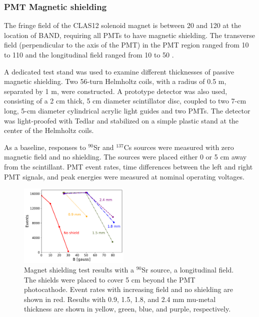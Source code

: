 \documentclass[3p,twocolumn]{elsarticle}
\begin{document}
\subsubsection{PMT Magnetic shielding}


The fringe field of the CLAS12 solenoid magnet
\cite{Fair:2020yfx} is between 20 and 120 \si{\gauss} at the location of
BAND, requiring all PMTs to have magnetic shielding. The transverse
field (perpendicular to the axis of the PMT) in the PMT region ranged from 10 to
  110 \si{\gauss} and the longitudinal field ranged from 10 to 50 \si{\gauss}.

  A dedicated test stand was used to examine different thicknesses of
  passive magnetic shielding. Two 56-turn Helmholtz
  coils, with a radius of 0.5 \si{\meter}, separated by 1 \si{\meter}, were 
  constructed. A prototype detector was also used, consisting of a 2 \si{\centi\meter} thick, 5
  \si{\centi\meter} diameter scintillator disc, coupled to two
  7-\si{\centi\meter} long, 5-\si{\centi\meter} diameter cylindrical
  acrylic light guides and two PMTs. The detector was
  light-proofed with Tedlar\textregistered{} and stabilized on a simple plastic stand
  at the center of the Helmholtz coils.

  As a baseline, responses to $^{90}$Sr and $^{137}$Cs sources were measured with zero magnetic field and no shielding. The sources were placed either 0 or 5 \si{\centi\meter} away from the scintillant. PMT event rates, time differences between the left and right PMT signals, and peak energies were measured at nominal operating voltages.
\begin{figure}[tb]
	\centering
			\includegraphics[width=0.47\textwidth]{fig9-shields.pdf}
	\caption{Magnet shielding test results with a $^{90}$Sr source, a longitudinal field. The shields were placed to cover 5 \si{\centi\meter} beyond the PMT photocathode. Event rates with increasing field and no shielding are shown in red. Results with 0.9, 1.5, 1.8, and 2.4 \si{\milli\meter} mu-metal thickness are shown in yellow, green, blue, and purple, respectively.}
	\label{fig:shielding_results}
\end{figure}  
  
\end{document}
